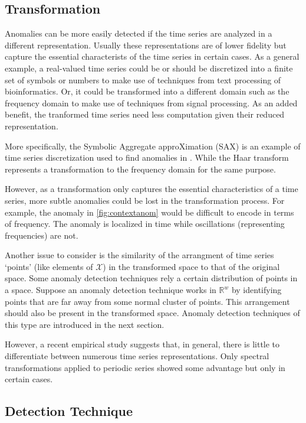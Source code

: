\subsection{Transformation}

Anomalies can be more easily detected if the time series are analyzed in a different representation. Usually these representations are of lower fidelity but capture the essential characterists of the time series in certain cases. As a general example, a real-valued time series could be or should be discretized into a finite set of symbols or numbers to make use of techniques from text processing of bioinformatics. Or, it could be transformed into a different domain such as the frequency domain to make use of techniques from signal processing. As an added benefit, the tranformed time series need less computation given their reduced representation.

More specifically, the Symbolic Aggregate approXimation (SAX) \cite{Lin2007} is an example of time series discretization used to find anomalies in  \cite{Keogh2005}. While the Haar transform represents a transformation to the frequency domain \cite{Bu2007,fu2006finding} for the same purpose.

However, as a transformation only captures the essential characteristics of a time series, more subtle anomalies could be lost in the transformation process. For example, the anomaly in \ref{fig:contextanom} would be difficult to encode in terms of frequency. The anomaly is localized in time while oscillations (representing frequencies) are not. 

Another issue to consider is the similarity of the arrangment of time series `points' (like elements of $\mathcal{X}$) in the transformed space to that of the original space. Some anomaly detection techniques rely a certain distribution of points in a space. Suppose an anomaly detection technique works in $\mathbb{R}^w$ by identifying points that are far away from some normal cluster of points. This arrangement should also be present in the transformed space. Anomaly detection techniques of this type are introduced in the next section. %

However, a recent empirical study \cite{Wang2013} suggests that, in general, there is little to differentiate between numerous time series representations. Only spectral transformations applied to periodic series showed some advantage but only in certain cases.

\subsection[adtechnique]{Detection Technique}


